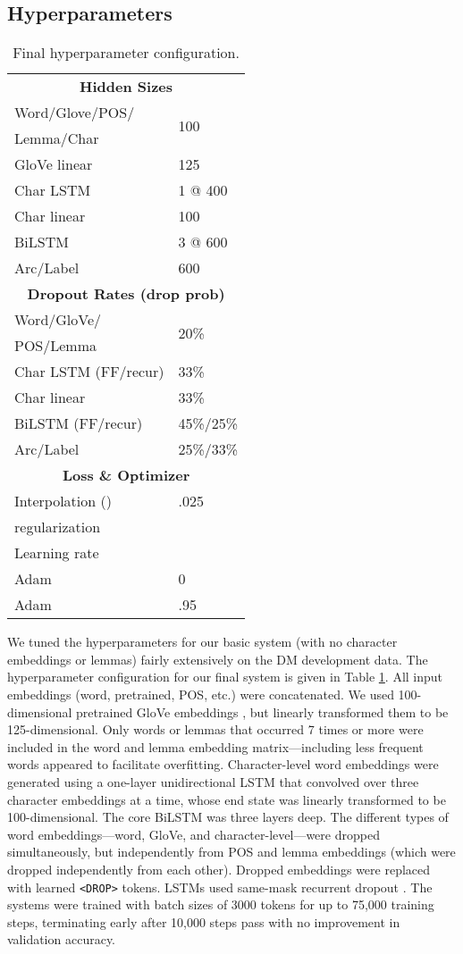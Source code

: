 \documentclass[11pt,a4paper]{article}
\begin{document}
\subsection{Hyperparameters\label{hp}}
\begin{table}[h!]
  \centering
  \begin{tabular}{ll}
    \multicolumn{2}{c}{\bf Hidden Sizes}\\
    Word/Glove/POS/ & \multirow{2}{*}{100}\\
    Lemma/Char\\
    GloVe linear & 125\\
    Char LSTM & 1 @ 400\\
    Char linear & 100\\
    BiLSTM & 3 @ 600\\
    Arc/Label & 600\\
    \multicolumn{2}{c}{\bf Dropout Rates (drop prob)}\\
    Word/GloVe/ & \multirow{2}{*}{20\%{}}\\
    POS/Lemma\\
    Char LSTM (FF/recur) & 33\%\\
    Char linear & 33\%\\
    BiLSTM (FF/recur) & 45\%/25\%\\
    Arc/Label & 25\%/33\%\\
    \multicolumn{2}{c}{\bf Loss \&{} Optimizer}\\
    Interpolation () & .025\\
     regularization & \\
    Learning rate& \\
    Adam  & 0\\
    Adam  & .95
  \end{tabular}
  \caption{Final hyperparameter configuration.}
  \label{hyperparams}
\end{table}
We tuned the hyperparameters for our basic system (with no character embeddings or lemmas) fairly extensively on the DM development data. The hyperparameter configuration for our final system is given in Table \ref{hyperparams}. All input embeddings (word, pretrained, POS, etc.) were concatenated. We used 100-dimensional pretrained GloVe embeddings \citep{PenningtonSocherManning2014}, but linearly transformed them to be 125-dimensional. Only words or lemmas that occurred 7 times or more were included in the word and lemma embedding matrix---including less frequent words appeared to facilitate overfitting. Character-level word embeddings were generated using a one-layer unidirectional LSTM that convolved over three character embeddings at a time, whose end state was linearly transformed to be 100-dimensional. The core BiLSTM was three layers deep. The different types of word embeddings---word, GloVe, and character-level---were dropped simultaneously, but independently from POS and lemma embeddings (which were dropped independently from each other). Dropped embeddings were replaced with learned \texttt{<DROP>} tokens. LSTMs used same-mask recurrent dropout \citep{GalGhahramani2016}. The systems were trained with batch sizes of 3000 tokens for up to 75,000 training steps, terminating early after 10,000 steps pass with no improvement in validation accuracy.
\end{document}
